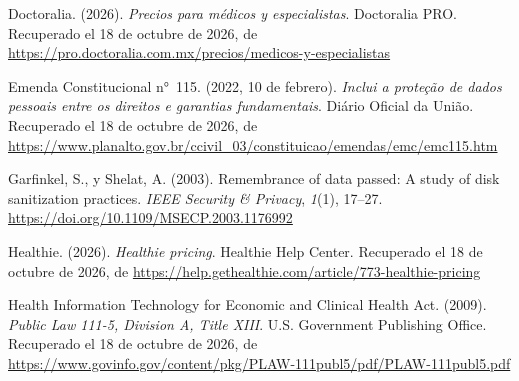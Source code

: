 \documentclass[12pt, a4paper]{article}
\begin{document}
\begin{list}{}{\setlength{\leftmargin}{1.27cm}\setlength{\itemindent}{-1.27cm}%
  \setlength{\labelwidth}{0pt}\setlength{\labelsep}{0pt}\setlength{\itemsep}{6pt}}

\item Doctoralia. (2026). \textit{Precios para médicos y
  especialistas}. Doctoralia PRO.
Recuperado el 18 de octubre de 2026, de \url{https://pro.doctoralia.com.mx/precios/medicos-y-especialistas}
 
 

\item Emenda Constitucional n°~115. (2022, 10 de febrero).
  \textit{Inclui a proteção de dados pessoais entre os direitos e
  garantias fundamentais}. Diário Oficial da União. Recuperado el 18 de octubre de 2026, de \url{https://www.planalto.gov.br/ccivil_03/constituicao/emendas/emc/emc115.htm}



\item Garfinkel, S., y Shelat, A. (2003). Remembrance of data
  passed: A study of disk sanitization practices.
  \textit{IEEE Security \& Privacy}, \textit{1}(1), 17--27.
  \url{https://doi.org/10.1109/MSECP.2003.1176992}



\item Healthie. (2026). \textit{Healthie pricing}. Healthie Help Center.
  Recuperado el 18 de octubre de 2026, de \url{https://help.gethealthie.com/article/773-healthie-pricing}

\item Health Information Technology for Economic and Clinical
  Health Act. (2009). \textit{Public Law 111-5, Division A,
  Title XIII}. U.S. Government Publishing Office.
  Recuperado el 18 de octubre de 2026, de \url{https://www.govinfo.gov/content/pkg/PLAW-111publ5/pdf/PLAW-111publ5.pdf}


\end{list}
\end{document}
